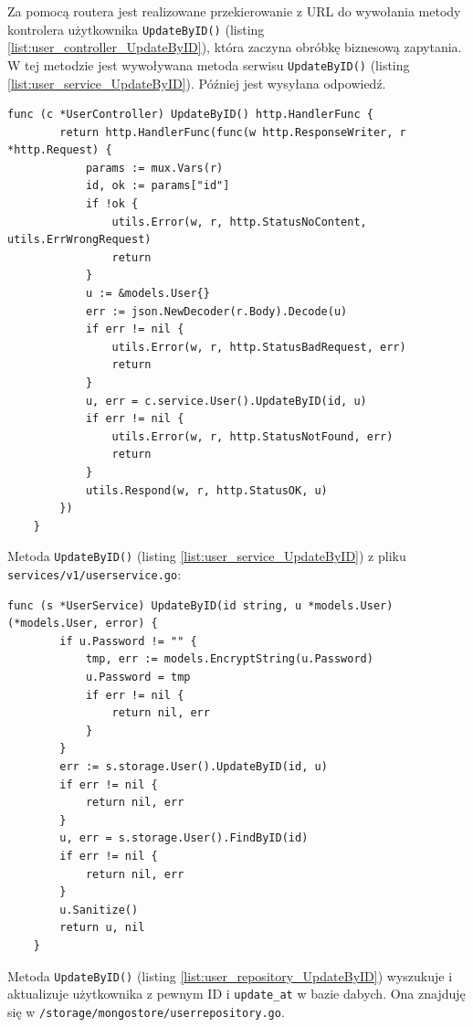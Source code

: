 Za pomocą routera jest realizowane przekierowanie z URL do wywołania metody kontrolera użytkownika \texttt{UpdateByID()} (listing \ref{list:user_controller_UpdateByID}), która zaczyna obróbkę biznesową zapytania.
W tej metodzie jest wywoływana metoda serwisu \texttt{UpdateByID()} (listing \ref{list:user_service_UpdateByID}). Później jest wysyłana odpowiedź.
\begin{lstlisting}[label=list:user_controller_UpdateByID,caption=Kontroler edycji użytkownika,basicstyle=\tiny\ttfamily]
    func (c *UserController) UpdateByID() http.HandlerFunc {
        return http.HandlerFunc(func(w http.ResponseWriter, r *http.Request) {
            params := mux.Vars(r)
            id, ok := params["id"]
            if !ok {
                utils.Error(w, r, http.StatusNoContent, utils.ErrWrongRequest)
                return
            }
            u := &models.User{}
            err := json.NewDecoder(r.Body).Decode(u)
            if err != nil {
                utils.Error(w, r, http.StatusBadRequest, err)
                return
            }
            u, err = c.service.User().UpdateByID(id, u)
            if err != nil {
                utils.Error(w, r, http.StatusNotFound, err)
                return
            }
            utils.Respond(w, r, http.StatusOK, u)
        })
    }
\end{lstlisting}
Metoda \texttt{UpdateByID()} (listing \ref{list:user_service_UpdateByID}) z pliku \texttt{services/v1/userservice.go}:
\begin{lstlisting}[label=list:user_service_UpdateByID,caption=Serwis edycji użytkownika,basicstyle=\tiny\ttfamily]
    func (s *UserService) UpdateByID(id string, u *models.User) (*models.User, error) {
        if u.Password != "" {
            tmp, err := models.EncryptString(u.Password)
            u.Password = tmp
            if err != nil {
                return nil, err
            }
        }
        err := s.storage.User().UpdateByID(id, u)
        if err != nil {
            return nil, err
        }
        u, err = s.storage.User().FindByID(id)
        if err != nil {
            return nil, err
        }
        u.Sanitize()
        return u, nil
    }
\end{lstlisting}
Metoda \texttt{UpdateByID()} (listing \ref{list:user_repository_UpdateByID}) wyszukuje i aktualizuje użytkownika z pewnym ID i \texttt{update\_at} w bazie dabych.
Ona znajduję się w \texttt{/storage/mongostore/userrepository.go}.
